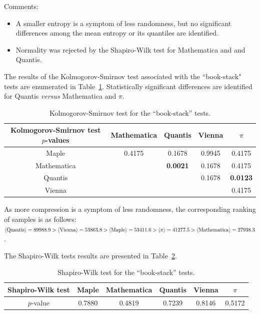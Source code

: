 \documentclass[10pt]{article}%
\begin{document}
Comments:

\begin{itemize}
\item A smaller entropy is a symptom of less randomness, but no significant differences among the mean entropy or its quantiles are identified.


\item 	Normality  was rejected by the Shapiro-Wilk test for Mathematica and and Quantis.

\end{itemize}
\fi

The results of the Kolmogorov-Smirnov test associated with the ``book-stack" tests are enumerated in Table~\ref{tab:8}.
Statistically significant differences are identified for
Quantis {\it versus} Mathematica and $\pi$.



\begin{table}
\caption{Kolmogorov-Smirnov test for the ``book-stack'' tests.}\label{tab:8}
 \begin{center}
 \begin{tabular}
[c]{ c c c c c }
\hline\hline
Kolmogorov-Smirnov test $p$-values & Mathematica & Quantis & Vienna & $\pi$ \\\hline
Maple  & 0.4175 & 0.1678 & 0.9945 & 0.4175\\
Mathematica &  & \bf{0.0021} & 0.1678 & 0.4175\\
Quantis &  &  & 0.1678 & \bf{0.0123}\\
Vienna &  &  &  & 0.4175\\\hline\hline
\end{tabular}
\end{center}
\end{table}


As more compression is a symptom of less randomness,  the corresponding ranking of
samples is as follows:
$\langle  {\rm  Quantis} \rangle  = 89988.9 > \langle  {\rm  Vienna} \rangle  = 53863.8  >  \langle  {\rm  Maple} \rangle  =
53411.6 > \langle  \pi \rangle  = 41277.5  >  \langle  {\rm  Mathematica} \rangle  = 27938.3$.


The Shapiro-Wilk tests results are presented in  Table~\ref{tab:9}.

\begin{table}
\caption{Shapiro-Wilk test for the ``book-stack'' tests.}\label{tab:9}
\begin{center}
\begin{tabular}
[c]{ c c c c c c }\hline\hline
Shapiro-Wilk test & Maple & Mathematica & Quantis & Vienna  & $\pi$\\\hline
$p$-value  & 0.7880 & 0.4819 & 0.7239 & 0.8146 &
0.5172\\\hline\hline
\end{tabular}
\end{center}
\end{table}
\end{document}
